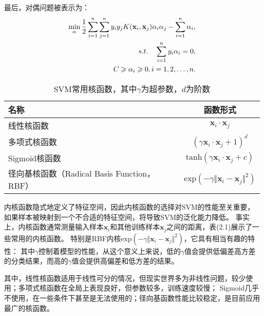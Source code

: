 最后，对偶问题被表示为：
\begin{align}
    \min_\alpha\frac{1}{2}\sum_{i=1}^n\sum_{j=1}^ny_iy_jK(\mathbf{x}_i,\mathbf{x}_j)\alpha_i\alpha_j-\sum_{i=1}^n\alpha_i, \\
    s.t.\quad \sum_{i=1}^ny_i\alpha_i=0, \notag \\
    C\geq\alpha_i\geq0,i=1,2,\ldots,n.\notag
\end{align}

\begin{table}[ht]
    \centering
    \caption{SVM常用核函数，其中$\gamma$为超参数，$d$为阶数}
    \begin{tabular}{lc}
        \hline
        {名称} & {函数形式}\\
        \hline
        {线性核函数} & {$\mathbf{x}_i\cdot\mathbf{x}_j$}\\
        {多项式核函数} & {$(\gamma\mathbf{x}_i\cdot\mathbf{x}_j+1)^d$}\\
        {Sigmoid核函数} & {$\mathrm{tanh}(\gamma\mathbf{x}_i\cdot\mathbf{x}_j+c)$}\\
        {径向基核函数（Radical Basis Function，RBF）} & {$\mathrm{exp}(-\gamma\Vert\mathbf{x}_i-\mathbf{x}_j\Vert^2)$}\\
        \hline
    \end{tabular}
\end{table}

内核函数隐式地定义了特征空间，因此内核函数的选择对SVM的性能至关重要，如果样本被映射到一个不合适的特征空间，将导致SVM的泛化能力降低。
事实上，内核函数通常测量输入样本$\mathbf{x}_i$和其他训练样本$\mathbf{x}_j$之间的距离，表(2.1)展示了一些常用的内核函数。
特别是RBF内核$\mathrm{exp}(-\gamma\Vert\mathbf{x}_i-\mathbf{x}_j\Vert^2)$，它具有相当有趣的特性：
其中$\gamma$控制着模型的性能，从这个意义上来说，低的$\gamma$值会提供低偏差高方差的分类结果，而高的$\gamma$值会提供高偏差和低方差的结果。

其中，线性核函数适用于线性可分的情况，但现实世界多为非线性问题，较少使用；多项式核函数在全局上表现良好，但参数较多，训练速度较慢；
Sigmoid几乎不使用，在一些条件下甚至是无法使用的；径向基函数性能比较稳定，是目前应用最广的核函数。